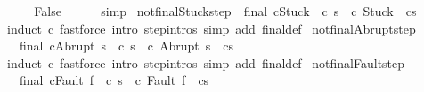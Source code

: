 \begin{isabellebody}
\ \ \isamarkupfalse%
\ \isamarkupfalse%
\ False\isanewline
\ \ \ \ \isamarkupfalse%
\ simp\isanewline
{}\isamarkupfalse%
%
\endisatagproof
{\isafoldproof}%
%
\isadelimproof
\isanewline
%
\endisadelimproof
\isanewline
{}\isamarkupfalse%
\ not{\isacharunderscore}final{\isacharunderscore}Stuck{\isacharunderscore}step{\isacharcolon}\ {\isachardoublequoteopen}{\isasymnot}\ final\ {\isacharparenleft}c{\isacharcomma}Stuck{\isacharparenright}\ {\isasymLongrightarrow}\ {\isasymexists}c{\isacharprime}\ s{\isacharprime}{\isachardot}\ {\isasymGamma}{\isasymturnstile}\ {\isacharparenleft}c{\isacharcomma}\ Stuck{\isacharparenright}\ {\isasymrightarrow}\ {\isacharparenleft}c{\isacharprime}{\isacharcomma}s{\isacharprime}{\isacharparenright}{\isachardoublequoteclose}\isanewline
%
\isadelimproof
%
\endisadelimproof
%
\isatagproof
{}\isamarkupfalse%
\ {\isacharparenleft}induct\ c{\isacharparenright}\ {\isacharparenleft}fastforce\ intro{\isacharcolon}\ step{\isachardot}intros\ simp\ add{\isacharcolon}\ final{\isacharunderscore}def{\isacharparenright}{\isacharplus}%
\endisatagproof
{\isafoldproof}%
%
\isadelimproof
\isanewline
%
\endisadelimproof
\isanewline
{}\isamarkupfalse%
\ not{\isacharunderscore}final{\isacharunderscore}Abrupt{\isacharunderscore}step{\isacharcolon}\ \isanewline
\ \ {\isachardoublequoteopen}{\isasymnot}\ final\ {\isacharparenleft}c{\isacharcomma}Abrupt\ s{\isacharparenright}\ {\isasymLongrightarrow}\ {\isasymexists}c{\isacharprime}\ s{\isacharprime}{\isachardot}\ {\isasymGamma}{\isasymturnstile}\ {\isacharparenleft}c{\isacharcomma}\ Abrupt\ s{\isacharparenright}\ {\isasymrightarrow}\ {\isacharparenleft}c{\isacharprime}{\isacharcomma}s{\isacharprime}{\isacharparenright}{\isachardoublequoteclose}\isanewline
%
\isadelimproof
%
\endisadelimproof
%
\isatagproof
{}\isamarkupfalse%
\ {\isacharparenleft}induct\ c{\isacharparenright}\ {\isacharparenleft}fastforce\ intro{\isacharcolon}\ step{\isachardot}intros\ simp\ add{\isacharcolon}\ final{\isacharunderscore}def{\isacharparenright}{\isacharplus}%
\endisatagproof
{\isafoldproof}%
%
\isadelimproof
\isanewline
%
\endisadelimproof
\isanewline
{}\isamarkupfalse%
\ not{\isacharunderscore}final{\isacharunderscore}Fault{\isacharunderscore}step{\isacharcolon}\ \isanewline
\ \ {\isachardoublequoteopen}{\isasymnot}\ final\ {\isacharparenleft}c{\isacharcomma}Fault\ f{\isacharparenright}\ {\isasymLongrightarrow}\ {\isasymexists}c{\isacharprime}\ s{\isacharprime}{\isachardot}\ {\isasymGamma}{\isasymturnstile}\ {\isacharparenleft}c{\isacharcomma}\ Fault\ f{\isacharparenright}\ {\isasymrightarrow}\ {\isacharparenleft}c{\isacharprime}{\isacharcomma}s{\isacharprime}{\isacharparenright}{\isachardoublequoteclose}\isanewline

\end{isabellebody}
